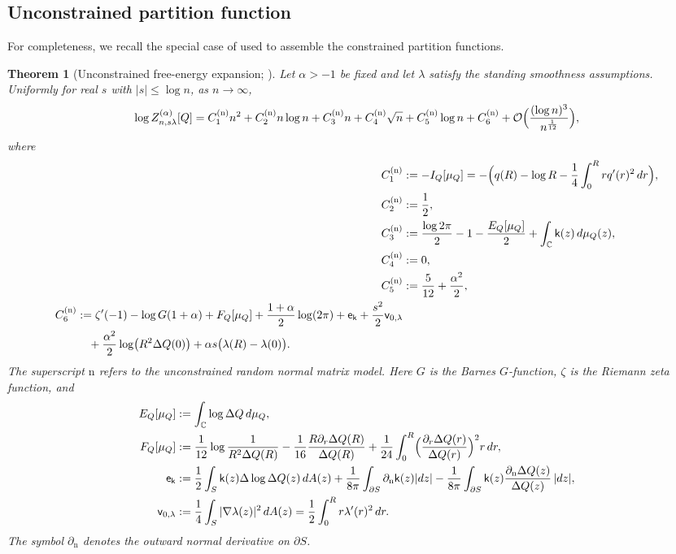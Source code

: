 \documentclass[a4paper]{article}
\newtheorem{theorem}{Theorem}[section]
\newcommand{\C}{\mathbb{C}}
\numberwithin{equation}{section}
\begin{document}
\subsection{Unconstrained partition function}
For completeness, we recall the special case of \cite{ACC2023c} used to
assemble the constrained partition functions.
\begin{theorem}[Unconstrained free-energy expansion; \cite{ACC2023c}]
\label{theorem:unconstrained-free-energy}
Let $\alpha>-1$ be fixed and let $\lambda$ satisfy the standing smoothness
assumptions.  Uniformly for real $s$ with $|s|\leq\log n$, as
$n\to\infty$,
\begin{equation}
\log Z_{n,s\lambda}^{(\alpha)}[Q]
=
C_1^{(\mathrm{n})}n^2
+C_2^{(\mathrm{n})}n\log n
+C_3^{(\mathrm{n})}n
+C_4^{(\mathrm{n})}\sqrt{n}
+C_5^{(\mathrm{n})}\log n
+C_6^{(\mathrm{n})}+\mathcal{O}\Bigl(\frac{(\log n)^3}{n^{\frac{1}{12}}}\Bigr),
\end{equation}
where 
\begin{align}
    C_1^{(\mathrm{n})}&:=-I_Q[\mu_Q]=-\Bigl(q(R)-\log R-\frac{1}{4}\int_{0}^{R}rq'(r)^2\,dr\Bigr),
    \\
    C_2^{(\mathrm{n})}&:=\frac{1}{2},
    \\
    C_3^{(\mathrm{n})}&:=\frac{\log 2\pi}{2}-1-\frac{E_Q[\mu_Q]}{2}+\int_{\C}\mathsf{k}(z)\,d\mu_Q(z),
    \\
    C_4^{(\mathrm{n})}&:=0,
    \\
    C_5^{(\mathrm{n})}&:=\frac{5}{12}+\frac{\alpha^2}{2},
    \\
    \begin{split}
    C_6^{(\mathrm{n})}&:=\zeta'(-1)-\log G(1+\alpha)+F_Q[\mu_Q]+\frac{1+\alpha}{2}\log(2\pi)+\mathsf{e}_{\mathsf{k}}+\frac{s^2}{2}\mathsf{v}_{0,\lambda}
    \\
    &\quad
    +\frac{\alpha^2}{2}\log\bigl(R^2\Delta Q(0)\bigr)+\alpha s\bigl(\lambda(R)-\lambda(0)\bigr).
\end{split}
\end{align}
The superscript $\mathrm n$ refers to the unconstrained random normal matrix
model.  Here $G$ is the Barnes $G$-function, $\zeta$ is the Riemann zeta
function, and
\begin{align*}
E_{Q}[\mu_{Q}]&:=\int_{\C}\log \Delta Q\,d\mu_{Q}, 
\\
F_{Q}[\mu_{Q}]&:=\frac{1}{12}\log\frac{1}{R^2\Delta Q(R)}-\frac{1}{16}\frac{R\partial_r\Delta Q(R)}{\Delta Q(R)}+\frac{1}{24}\int_0^{R}\Bigl(\frac{\partial_r\Delta Q(r)}{\Delta Q(r)}\Bigr)^2r\,dr, 
\\
\mathsf{e}_{\mathsf{k}}
&:=
\frac{1}{2}\int_{S}\mathsf{k}(z)\Delta \log \Delta Q(z)\,dA(z)+\frac{1}{8\pi}\int_{\partial S}\partial_{\mathrm{n}}\mathsf{k}(z)|dz|-\frac{1}{8\pi}\int_{\partial S}\mathsf{k}(z)\frac{\partial_{\mathrm{n}}\Delta Q(z)}{\Delta Q(z)}\,|dz|, 
\\
\mathsf{v}_{0,\lambda}
&:=\frac{1}{4}\int_{S}|\nabla \lambda(z)|^2\,dA(z)
=\frac{1}{2}\int_{0}^{R}r\lambda'(r)^2\,dr. 
\end{align*}
The symbol $\partial_{\mathrm n}$ denotes the outward normal derivative on
$\partial S$.
\end{theorem}
\end{document}
